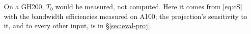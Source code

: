 On a GH200, $T_0$ would be measured, not computed. Here it comes from
\cref{eq:cS} with the bandwidth efficiencies measured on A100; the projection's
sensitivity to it, and to every other input, is in \S\ref{sec:eval-proj}.
